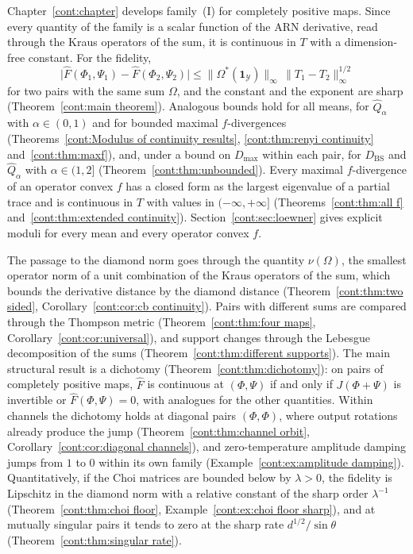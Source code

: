 Chapter~\ref{cont:chapter} develops family~(I) for completely positive maps. Since every quantity of the family is a scalar function of the ARN derivative, read through the Kraus operators of the sum, it is continuous in $T$ with a dimension-free constant. For the fidelity,
\[
\big|\widehat F(\Phi_1,\Psi_1)-\widehat F(\Phi_2,\Psi_2)\big|\le\|\Omega^*(\mathbf 1_{\mathcal Y})\|_\infty\,\|T_1-T_2\|_\infty^{1/2}
\]
for two pairs with the same sum $\Omega$, and the constant and the exponent are sharp (Theorem~\ref{cont:main theorem}). Analogous bounds hold for all means, for $\widehat Q_\alpha$ with $\alpha\in(0,1)$ and for bounded maximal $f$-divergences (Theorems~\ref{cont:Modulus of continuity results}, \ref{cont:thm:renyi continuity} and~\ref{cont:thm:maxf}), and, under a bound on $D_{\max}$ within each pair, for $D_{\mathrm{BS}}$ and $\widehat Q_\alpha$ with $\alpha\in(1,2]$ (Theorem~\ref{cont:thm:unbounded}). Every maximal $f$-divergence of an operator convex $f$ has a closed form as the largest eigenvalue of a partial trace and is continuous in $T$ with values in $(-\infty,+\infty]$ (Theorems~\ref{cont:thm:all f} and~\ref{cont:thm:extended continuity}). Section~\ref{cont:sec:loewner} gives explicit moduli for every mean and every operator convex $f$.

The passage to the diamond norm goes through the quantity $\nu(\Omega)$, the smallest operator norm of a unit combination of the Kraus operators of the sum, which bounds the derivative distance by the diamond distance (Theorem~\ref{cont:thm:two sided}, Corollary~\ref{cont:cor:cb continuity}). Pairs with different sums are compared through the Thompson metric (Theorem~\ref{cont:thm:four maps}, Corollary~\ref{cont:cor:universal}), and support changes through the Lebesgue decomposition of the sums (Theorem~\ref{cont:thm:different supports}). The main structural result is a dichotomy (Theorem~\ref{cont:thm:dichotomy}): on pairs of completely positive maps, $\widehat F$ is continuous at $(\Phi,\Psi)$ if and only if $J(\Phi+\Psi)$ is invertible or $\widehat F(\Phi,\Psi)=0$, with analogues for the other quantities. Within channels the dichotomy holds at diagonal pairs $(\Phi,\Phi)$, where output rotations already produce the jump (Theorem~\ref{cont:thm:channel orbit}, Corollary~\ref{cont:cor:diagonal channels}), and zero-temperature amplitude damping jumps from $1$ to $0$ within its own family (Example~\ref{cont:ex:amplitude damping}). Quantitatively, if the Choi matrices are bounded below by $\lambda>0$, the fidelity is Lipschitz in the diamond norm with a relative constant of the sharp order $\lambda^{-1}$ (Theorem~\ref{cont:thm:choi floor}, Example~\ref{cont:ex:choi floor sharp}), and at mutually singular pairs it tends to zero at the sharp rate $d^{1/2}/\sin\theta$ (Theorem~\ref{cont:thm:singular rate}).


